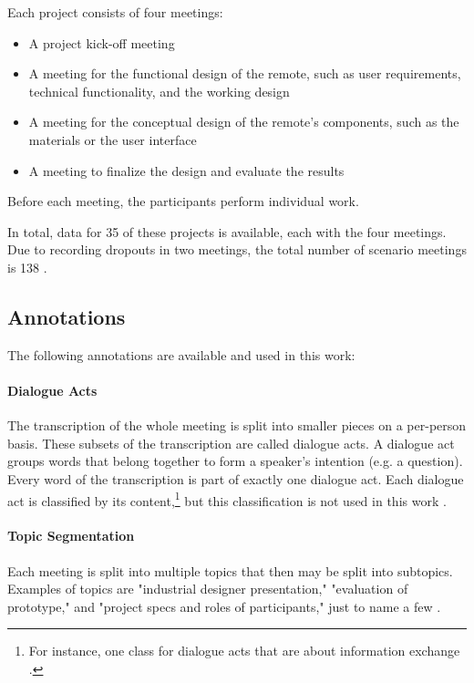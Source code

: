Each project consists of four meetings:
\begin{itemize}
\item A project kick-off meeting
\item A meeting for the functional design of the remote, such as user requirements, technical functionality, and the working design
\item A meeting for the conceptual design of the remote's components, such as the materials or the user interface
\item A meeting to finalize the design and evaluate the results
\end{itemize}
Before each meeting, the participants perform individual work.

In total, data for 35 of these projects is available, each with the four meetings. 
Due to recording dropouts in two meetings, the total number of scenario meetings is 138 \cite[p.~2]{Mccowan05theami}.

\subsection{Annotations}\label{ssec:ami-annotations}

The following annotations are available and used in this work:

\paragraph{Dialogue Acts}

The transcription of the whole meeting is split into smaller pieces on a per-person basis.
These subsets of the transcription are called dialogue acts.
A dialogue act groups words that belong together to form a speaker's intention (e.g. a question).
Every word of the transcription is part of exactly one dialogue act.
Each dialogue act is classified by its content,\footnote{For instance, one class for dialogue acts that are about information exchange \cite[p.~8]{guidelinesAmiDA}.} but this classification is not used in this work \cite{amiWebsite}.

\paragraph{Topic Segmentation}

Each meeting is split into multiple topics that then may be split into subtopics.
Examples of topics are "industrial designer presentation," "evaluation of prototype," and "project specs and roles of participants," just to name a few \cite{amiWebsite}.

